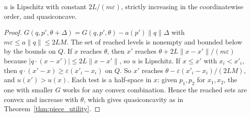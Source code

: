\begin{theorem}
\label{thm:std_utility_props}
\leanok
{}
$u$ is Lipschitz with constant $2L/(m\varepsilon)$, strictly increasing in the coordinatewise order, and quasiconcave.
\end{theorem}
\begin{proof}
\leanok
$G(q,p',\theta+\Delta) = G(q,p',\theta) - a(p')\|q\|\Delta$ with $m\varepsilon \le a\|q\| \le 2LM$. The set of reached
levels is nonempty and bounded below by the bounds on $Q$. If $x$ reaches $\theta$, then $x'$ reaches
$\theta + 2L\|x - x'\|/(m\varepsilon)$ because $|q\cdot(x - x')| \le 2L\|x - x'\|$, so $u$ is Lipschitz. If $x \le x'$ with
$x_i < x'_i$, then $q \cdot (x' - x) \ge \varepsilon(x'_i - x_i)$ on $Q$. So $x'$ reaches $\theta - \varepsilon(x'_i - x_i)/(2LM)$,
and $u(x') > u(x)$. Each test is a half-space in $x$: given $p_1, p_2$ for $x_1, x_2$, the one with smaller $G$ works for any
convex combination. Hence the reached sets are convex and increase with $\theta$, which gives quasiconcavity as in
Theorem~\ref{thm:piece_utility}.
\end{proof}

